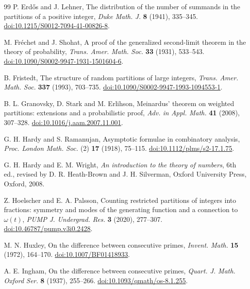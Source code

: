 \documentclass[11pt]{amsart}
\theoremstyle{remark}
\begin{document}
\begin{thebibliography}{99}
P. Erd\H{o}s and J. Lehner, The distribution of the number of summands in the partitions of a positive integer,
\emph{Duke Math. J.} \textbf{8} (1941), 335--345.
\href{https://doi.org/10.1215/S0012-7094-41-00826-8}{doi:10.1215/S0012-7094-41-00826-8}.

M. Fr\'echet and J. Shohat,
A proof of the generalized second-limit theorem in the theory of probability,
\emph{Trans. Amer. Math. Soc.} \textbf{33} (1931), 533--543.
\href{https://doi.org/10.1090/S0002-9947-1931-1501604-6}{doi:10.1090/S0002-9947-1931-1501604-6}.

B. Fristedt, The structure of random partitions of large integers,
\emph{Trans. Amer. Math. Soc.} \textbf{337} (1993), 703--735.
\href{https://doi.org/10.1090/S0002-9947-1993-1094553-1}{doi:10.1090/S0002-9947-1993-1094553-1}.

B. L. Granovsky, D. Stark and M. Erlihson,
Meinardus' theorem on weighted partitions: extensions and a probabilistic proof,
\emph{Adv. in Appl. Math.} \textbf{41} (2008), 307--328.
\href{https://doi.org/10.1016/j.aam.2007.11.001}{doi:10.1016/j.aam.2007.11.001}.

G. H. Hardy and S. Ramanujan, Asymptotic formulae in combinatory analysis,
\emph{Proc. London Math. Soc.} (2) \textbf{17} (1918), 75--115.
\href{https://doi.org/10.1112/plms/s2-17.1.75}{doi:10.1112/plms/s2-17.1.75}.

G. H. Hardy and E. M. Wright, \emph{An introduction to the theory of numbers},
6th ed., revised by D. R. Heath-Brown and J. H. Silverman, Oxford University Press, Oxford, 2008.

Z. Hoelscher and E. A. Palsson,
Counting restricted partitions of integers into fractions: symmetry and modes of the generating function and a connection to \(\omega(t)\),
\emph{PUMP J. Undergrad. Res.} \textbf{3} (2020), 277--307.
\href{https://doi.org/10.46787/pump.v3i0.2428}{doi:10.46787/pump.v3i0.2428}.

M. N. Huxley, On the difference between consecutive primes,
\emph{Invent. Math.} \textbf{15} (1972), 164--170.
\href{https://doi.org/10.1007/BF01418933}{doi:10.1007/BF01418933}.

A. E. Ingham, On the difference between consecutive primes,
\emph{Quart. J. Math. Oxford Ser.} \textbf{8} (1937), 255--266.
\href{https://doi.org/10.1093/qmath/os-8.1.255}{doi:10.1093/qmath/os-8.1.255}.


\end{thebibliography}
\end{document}
